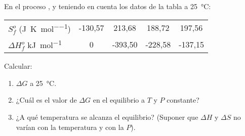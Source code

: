 En el proceso , y teniendo en cuenta los datos de la tabla a \SI{25}{\celsius}:
    \begin{center}
        \begin{tabular}{lSSSS}
            \toprule
                                                      &  &  &  & \\
            \midrule
            $S_f^o$ (\si{\joule\per\kelvin\per\mol})  & -130,57    &  213,68     &  188,72     &  197,56   \\
            $\Delta H_f^o$ \si{\kilo\joule\per\mol}   & 0          & -393,50     & -228,58     & -137,15   \\   
            \bottomrule
        \end{tabular}
    \end{center}
    Calcular:
    \begin{enumerate}[label={\alph*)},font={\color{red!50!black}\bfseries}]
        \item $\Delta G$ a \SI{25}{\celsius}.
        \item ¿Cuál es el valor de $\Delta G$ en el equilibrio a $T$ y $P$ constante?
        \item ¿A qué temperatura se alcanza el equilibrio? (Suponer que $\Delta H$ y $\Delta S$ no varían con la temperatura y con la $P$).
    \end{enumerate}
